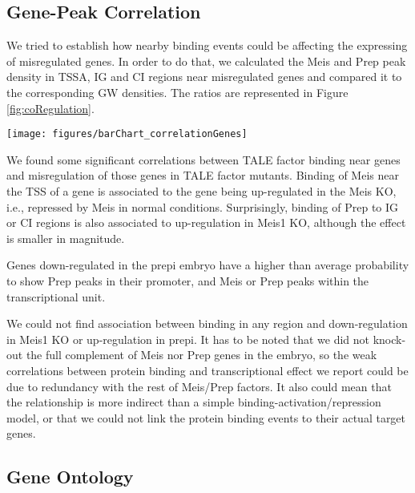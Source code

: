 \subsection{Gene-Peak Correlation}

We tried to establish how nearby binding events could be affecting the expressing of misregulated genes. In order to do that, we calculated the Meis and Prep peak density in \ac{TSSA}, \ac{IG} and \ac{CI} regions near misregulated genes and compared it to the corresponding \ac{GW} densities. The ratios are represented in Figure \ref{fig:coRegulation}.

\begin{SCfigure}[]
  \centering
  \texttt{[image: figures/barChart\_correlationGenes]}
  \caption[Correlation Between Misregulation and TALE Binding]{\textbf{Correlation Between Misregulation and TALE Binding.} Ratio of Meis and Prep peak density in misregulated gene-associated \ac{TSSA}, \ac{IG} and \ac{CI} regions to the corresponding \ac{GW} averages. Asterisks mark p-value \< $10^{-3}$.}
  \label{fig:coRegulation}
\end{SCfigure}

We found some significant correlations between \ac{TALE} factor binding near genes and misregulation of those genes in \ac{TALE} factor mutants. Binding of Meis near the \ac{TSS} of a gene is associated to the gene being up-regulated in the Meis \ac{KO}, i.e., repressed by Meis in normal conditions. Surprisingly, binding of Prep to \ac{IG} or \ac{CI} regions is also associated to up-regulation in Meis1 \ac{KO}, although the effect is smaller in magnitude. 

Genes down-regulated in the \ac{prepi} embryo have a higher than average probability to show Prep peaks in their promoter, and Meis or Prep peaks within the transcriptional unit. 

We could not find association between binding in any region and down-regulation in Meis1 \ac{KO} or up-regulation in \ac{prepi}. It has to be noted that we did not knock-out the full complement of Meis nor Prep genes in the embryo, so the weak correlations between protein binding and transcriptional effect we report could be due to redundancy with the rest of Meis/Prep factors. It also could mean that the relationship is more indirect than a simple binding-activation/repression model, or that we could not link the protein binding events to their actual target genes. 

\subsection{Gene Ontology}

